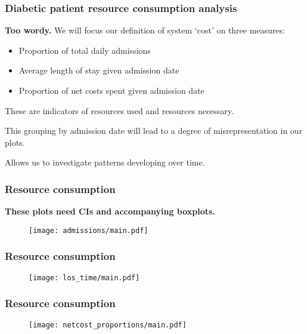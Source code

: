 \begin{frame}
    \frametitle{Diabetic patient resource consumption analysis}
    \textbf{Too wordy.}
    We will focus our definition of system `cost' on three measures:

    \pause%
    \begin{itemize}
        \item Proportion of total daily admissions
        \item Average length of stay given admission date
        \item Proportion of net costs spent given admission date
    \end{itemize}

    \pause%
    \vspace{10pt}
    These are indicators of resources used and resources necessary.

    \vspace{10pt}
    This grouping by admission date will lead to a degree of misrepresentation
    in our plots.

    \vspace{10pt}
    Allows us to investigate patterns developing over time.
\end{frame}

\begin{frame}
    \frametitle{Resource consumption}
    \textbf{These plots need CIs and accompanying boxplots.}
    \begin{figure}
    \texttt{[image: admissions/main.pdf]}
    \end{figure}
\end{frame}

\begin{frame}
    \frametitle{Resource consumption}

    \begin{figure}
        \texttt{[image: los\_time/main.pdf]}
    \end{figure}
\end{frame}

\begin{frame}
    \frametitle{Resource consumption}

    \begin{figure}
    \texttt{[image: netcost\_proportions/main.pdf]}
    \end{figure}
\end{frame}
